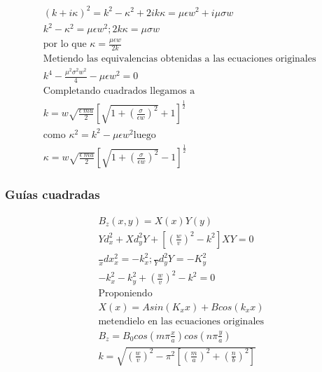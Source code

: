 \begin{subequations}
	\begin{gather}
	(k+i\kappa)^2=k^2-\kappa^2+2ik\kappa=\mu\epsilon w^2+i\mu\sigma w \nonumber \\
	k^2 - \kappa^2 = \mu \epsilon w^2 ; 2 k \kappa = \mu \sigma w \nonumber \\
	\text{por lo que } \kappa=\frac{\mu \epsilon w}{2 k}\nonumber \\
\text{Metiendo las equivalencias obtenidas a las ecuaciones originales } \\ 
	k^4 - \frac{\mu^2 \sigma^2 w^2}{4} - \mu \epsilon w^2=0 \nonumber\\
	\text{Completando cuadrados llegamos a } \nonumber \\
	 k= w \sqrt{\frac{\epsilon \ mu}{2}} [\sqrt{1+(\frac{\sigma}{\epsilon w})^2}+1]^\frac{1}{2} \\
	 \text{como } \kappa^2 = k^2 - \mu \epsilon w^2 \text{luego} \nonumber\\
	 \kappa = w \sqrt{\frac{\epsilon \ mu}{2}} [\sqrt{1+(\frac{\sigma}{\epsilon w})^2}-1]^\frac{1}{2}
	\end{gather}
\end{subequations}
\subsubsection{Guías cuadradas}
\begin{subequations}
	\begin{align}
		B_{z}(x,y)=X(x)Y(y) \nonumber \\
		Y d_{x}^2+X d_{y}^2Y + [(\frac{w}{v})^2-k^2]XY=0 \nonumber \\
		\frac{}{x} dx_{x}^2=-k_{x}^2 ; \frac{}{Y}d_{y}^2 Y = -K_{y}^2 \nonumber \\
		-k_{x}^2 - k_{y}^2+(\frac{w}{v})^2 - k^2 = 0 \nonumber\\
		\text{Proponiendo } \nonumber \\
		X(x)=A sin (K_{x} x) + B cos(k_{x}x)  \\
		\text{metendielo en las ecuaciones originales} \nonumber \\
		B_{z}=B_{0} cos(m \pi \frac{x}{a}) cos(n \pi \frac{y}{a}) \\
		k = \sqrt{(\frac{w}{v})^2-\pi^2 [(\frac{m}{a})^2+(\frac{n}{b})^2]} 
	\end{align}
\end{subequations}
